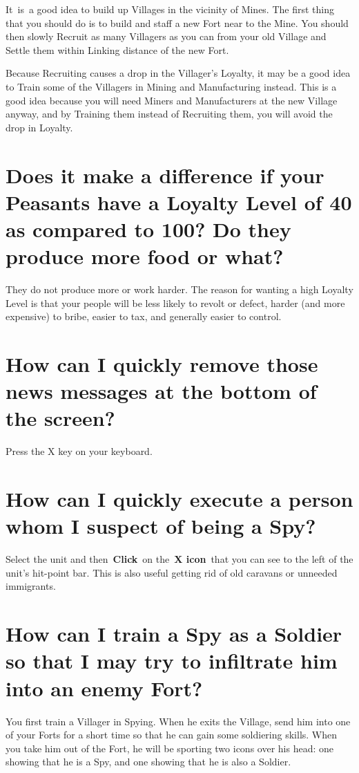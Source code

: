 It is a good idea to build up Villages in the vicinity of Mines. The first thing that you should do is to build and staff a new Fort near to the Mine. You should then slowly Recruit as many Villagers as you can from your old Village and Settle them within Linking distance of the new Fort.

Because Recruiting causes a drop in the Villager’s Loyalty, it may be a good idea to Train some of the Villagers in Mining and Manufacturing instead. This is a good idea because you will need Miners and Manufacturers at the new Village anyway, and by Training them instead of Recruiting them, you will avoid the drop in Loyalty.

\section{Does it make a difference if your Peasants have a Loyalty Level of 40 as compared to 100? Do they produce more food or what?}

They do not produce more or work harder. The reason for wanting a high Loyalty Level is that your people will be less likely to revolt or defect, harder (and more expensive) to bribe, easier to tax, and generally easier to control.

\section{How can I quickly remove those news messages at the bottom of the screen?}

Press the X key on your keyboard.

\section{How can I quickly execute a person whom I suspect of being a Spy?}

Select the unit and then \textbf{Click} on the \textbf{X icon} that you can see to the left of the unit’s hit-point bar. This is also useful getting rid of old caravans or unneeded immigrants.

\section{How can I train a Spy as a Soldier so that I may try to infiltrate him into an enemy Fort?}

You first train a Villager in Spying. When he exits the Village, send him into one of your Forts for a short time so that he can gain some soldiering skills. When you take him out of the Fort, he will be sporting two icons over his head: one showing that he is a Spy, and one showing that he is also a Soldier.